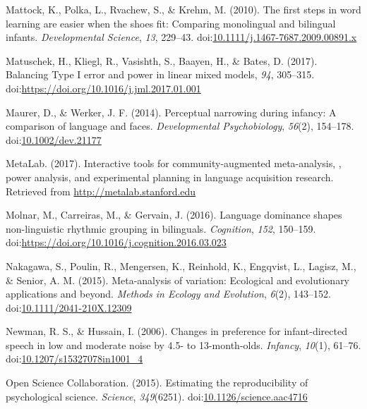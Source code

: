 \documentclass[,man,floatsintext]{apa6}
\begin{document}
\leavevmode\hypertarget{ref-mattock_2010}{}%
Mattock, K., Polka, L., Rvachew, S., \& Krehm, M. (2010). The first steps in word learning are easier when the shoes fit: Comparing monolingual and bilingual infants. \emph{Developmental Science}, \emph{13}, 229--43. doi:\href{https://doi.org/10.1111/j.1467-7687.2009.00891.x}{10.1111/j.1467-7687.2009.00891.x}

\leavevmode\hypertarget{ref-matuschek_2017}{}%
Matuschek, H., Kliegl, R., Vasishth, S., Baayen, H., \& Bates, D. (2017). Balancing Type I error and power in linear mixed models, \emph{94}, 305--315. doi:\href{https://doi.org/https://doi.org/10.1016/j.jml.2017.01.001}{https://doi.org/10.1016/j.jml.2017.01.001}

\leavevmode\hypertarget{ref-maurer_2014}{}%
Maurer, D., \& Werker, J. F. (2014). Perceptual narrowing during infancy: A comparison of language and faces. \emph{Developmental Psychobiology}, \emph{56}(2), 154--178. doi:\href{https://doi.org/10.1002/dev.21177}{10.1002/dev.21177}

\leavevmode\hypertarget{ref-metalab_2017}{}%
MetaLab. (2017). Interactive tools for community-augmented meta-analysis, , power analysis, and experimental planning in language acquisition research. Retrieved from \url{http://metalab.stanford.edu}

\leavevmode\hypertarget{ref-molnar_2016}{}%
Molnar, M., Carreiras, M., \& Gervain, J. (2016). Language dominance shapes non-linguistic rhythmic grouping in bilinguals. \emph{Cognition}, \emph{152}, 150--159. doi:\href{https://doi.org/https://doi.org/10.1016/j.cognition.2016.03.023}{https://doi.org/10.1016/j.cognition.2016.03.023}

\leavevmode\hypertarget{ref-nakagawa_2015}{}%
Nakagawa, S., Poulin, R., Mengersen, K., Reinhold, K., Engqvist, L., Lagisz, M., \& Senior, A. M. (2015). Meta-analysis of variation: Ecological and evolutionary applications and beyond. \emph{Methods in Ecology and Evolution}, \emph{6}(2), 143--152. doi:\href{https://doi.org/10.1111/2041-210X.12309}{10.1111/2041-210X.12309}

\leavevmode\hypertarget{ref-newman_2006}{}%
Newman, R. S., \& Hussain, I. (2006). Changes in preference for infant-directed speech in low and moderate noise by 4.5- to 13-month-olds. \emph{Infancy}, \emph{10}(1), 61--76. doi:\href{https://doi.org/10.1207/s15327078in1001_4}{10.1207/s15327078in1001\_4}

\leavevmode\hypertarget{ref-open_science_collab_2015}{}%
Open Science Collaboration. (2015). Estimating the reproducibility of psychological science. \emph{Science}, \emph{349}(6251). doi:\href{https://doi.org/10.1126/science.aac4716}{10.1126/science.aac4716}
\end{document}
